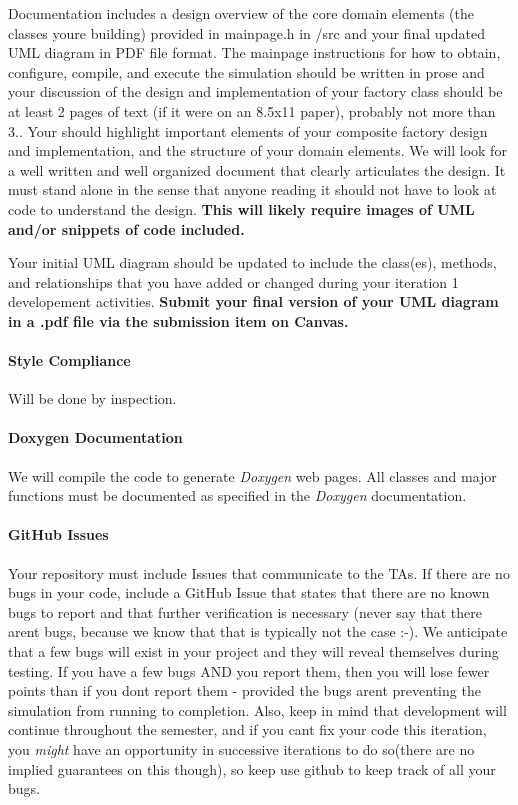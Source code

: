 Documentation includes a design overview of the core domain elements (the classes you\textquotesingle{}re building) provided in mainpage.\+h in /src and your final updated U\+ML diagram in P\+DF file format. The mainpage instructions for how to obtain, configure, compile, and execute the simulation should be written in prose and your discussion of the design and implementation of your factory class should be at least 2 pages of text (if it were on an 8.\+5x11 paper), probably not more than 3.. Your should highlight important elements of your composite factory design and implementation, and the structure of your domain elements. We will look for a well written and well organized document that clearly articulates the design. It must stand alone in the sense that anyone reading it should not have to look at code to understand the design. {\bfseries This will likely require images of U\+ML and/or snippets of code included.}

Your initial U\+ML diagram should be updated to include the class(es), methods, and relationships that you have added or changed during your iteration 1 developement activities. {\bfseries Submit your final version of your U\+ML diagram in a .pdf file via the submission item on Canvas.}

\paragraph*{Style Compliance}

Will be done by inspection.

\paragraph*{Doxygen Documentation}

We will compile the code to generate {\itshape Doxygen} web pages. All classes and major functions must be documented as specified in the {\itshape Doxygen} documentation.

\paragraph*{Git\+Hub Issues}

Your repository must include Issues that communicate to the T\+As. If there are no bugs in your code, include a Git\+Hub Issue that states that there are no known bugs to report and that further verification is necessary (never say that there aren\textquotesingle{}t bugs, because we know that that is typically not the case \+:-\/). We anticipate that a few bugs will exist in your project and they will reveal themselves during testing. If you have a few bugs A\+ND you report them, then you will lose fewer points than if you don\textquotesingle{}t report them -\/ provided the bugs aren\textquotesingle{}t preventing the simulation from running to completion. Also, keep in mind that development will continue throughout the semester, and if you can\textquotesingle{}t fix your code this iteration, you {\itshape might} have an opportunity in successive iterations to do so(there are no implied guarantees on this though), so keep use github to keep track of all your bugs.

